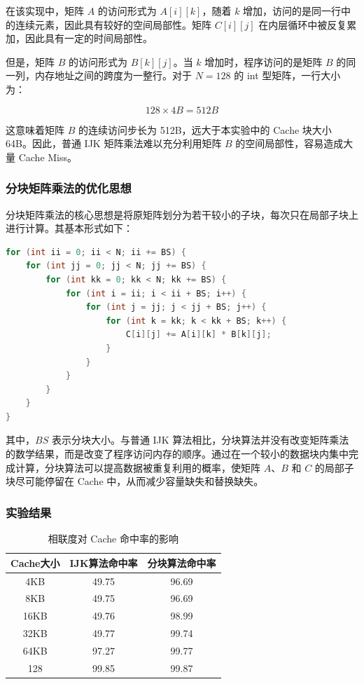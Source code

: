 在该实现中，矩阵 $A$ 的访问形式为 $A[i][k]$，随着 $k$ 增加，访问的是同一行中的连续元素，因此具有较好的空间局部性。矩阵 $C[i][j]$ 在内层循环中被反复累加，因此具有一定的时间局部性。

但是，矩阵 $B$ 的访问形式为 $B[k][j]$。当 $k$ 增加时，程序访问的是矩阵 $B$ 的同一列，内存地址之间的跨度为一整行。对于 $N=128$ 的 int 型矩阵，一行大小为：

\[
128 \times 4B = 512B
\]

这意味着矩阵 $B$ 的连续访问步长为 512B，远大于本实验中的 Cache 块大小 64B。因此，普通 IJK 矩阵乘法难以充分利用矩阵 $B$ 的空间局部性，容易造成大量 Cache Miss。

\subsubsection{分块矩阵乘法的优化思想}

分块矩阵乘法的核心思想是将原矩阵划分为若干较小的子块，每次只在局部子块上进行计算。其基本形式如下：

\begin{lstlisting}[language=C, caption={分块矩阵乘法}]
for (int ii = 0; ii < N; ii += BS) {
    for (int jj = 0; jj < N; jj += BS) {
        for (int kk = 0; kk < N; kk += BS) {
            for (int i = ii; i < ii + BS; i++) {
                for (int j = jj; j < jj + BS; j++) {
                    for (int k = kk; k < kk + BS; k++) {
                        C[i][j] += A[i][k] * B[k][j];
                    }
                }
            }
        }
    }
}
\end{lstlisting}

其中，$BS$ 表示分块大小。与普通 IJK 算法相比，分块算法并没有改变矩阵乘法的数学结果，而是改变了程序访问内存的顺序。通过在一个较小的数据块内集中完成计算，分块算法可以提高数据被重复利用的概率，使矩阵 $A$、$B$ 和 $C$ 的局部子块尽可能停留在 Cache 中，从而减少容量缺失和替换缺失。

\subsubsection{实验结果}\begin{table}[H]
\centering
\caption{相联度对 Cache 命中率的影响}
\begin{tabular}{c|c|c}
\hline
Cache大小 & IJK算法命中率 & 分块算法命中率\\
\hline
4KB & 49.75& 96.69\\
8KB & 49.75 & 96.69 \\
16KB & 49.76& 98.99\\
32KB &49.77 & 99.74\\
64KB &97.27 &99.77 \\
128 & 99.85&99.87\\
\hline
\end{tabular}
\end{table}

